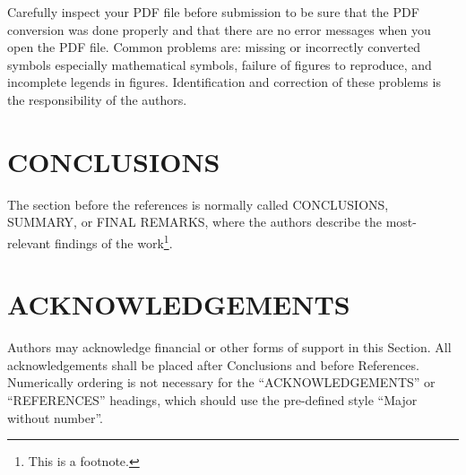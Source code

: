 Carefully inspect your PDF file before submission to be sure that the PDF conversion was done properly and that there are no error messages when you open the PDF file. Common problems are: missing or incorrectly converted symbols especially mathematical symbols, failure of figures to reproduce, and incomplete legends in figures. Identification and correction of these problems is the responsibility of the authors.

\section{\uppercase{Conclusions}}

The section before the references is normally called CONCLUSIONS, SUMMARY, or FINAL REMARKS, where the authors describe the most-relevant findings of the work\footnote{This is a footnote.}.

\section*{\uppercase{Acknowledgements}} 

Authors may acknowledge financial or other forms of support in this Section. All acknowledgements shall be placed after Conclusions and before References. Numerically ordering is not necessary for the ``ACKNOWLEDGEMENTS'' or ``REFERENCES'' headings, which should use the pre-defined style ``Major without number''.

